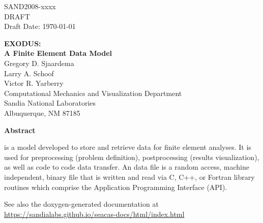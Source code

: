 \begin{titlepage}
\begin{center}
SAND2008-xxxx\\
DRAFT\\
Draft Date: \today\\
\end{center}

\vspace{1.0in}

\begin{center}
{\Huge\bf EXODUS:\\ A Finite Element Data Model\\}
\vspace{1.0in}
{\large Gregory D. Sjaardema\\
	Larry A. Schoof\\
	Victor R. Yarberry\\
	Computational Mechanics and Visualization Department\\
	Sandia National Laboratories\\
	Albuquerque, NM 87185}
\end{center}
\vspace{1.0in}
\begin{center}
\large\bf Abstract
\end{center}

\exo{} is a model developed to store and retrieve data for finite
element analyses. It is used for preprocessing (problem definition),
postprocessing (results visualization), as well as code to code data
transfer. An \exo{} data file is a random access, machine independent,
binary file that is written and read via C, C++, or Fortran library
routines which comprise the Application Programming Interface (API).

See also the doxygen-generated documentation at \url{https://sandialabs.github.io/seacas-docs/html/index.html}

\end{titlepage}
